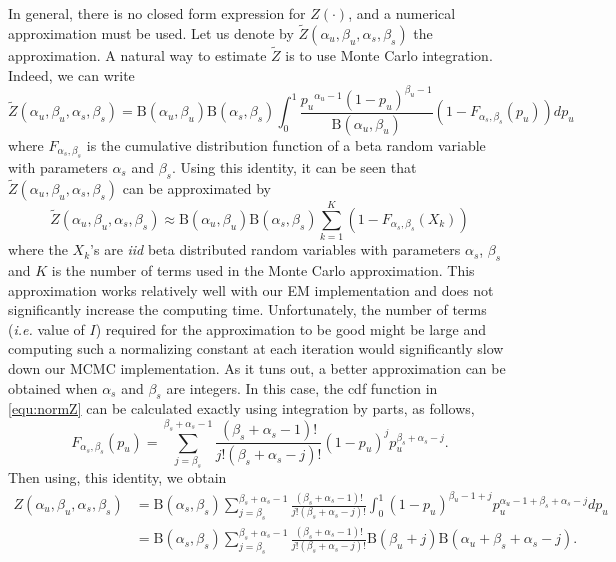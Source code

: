 \documentclass{article}
\begin{document}
In general, there is no closed form expression for $Z(\cdot)$, and a numerical approximation must be used. Let us denote by $\tilde{Z}(\alpha_u, \beta_u, \alpha_s, \beta_s)$ the approximation. A natural way to estimate $\tilde{Z}$ is to use Monte Carlo integration. Indeed, we can write 
\begin{equation}
\tilde{Z}(\alpha_u, \beta_u, \alpha_s, \beta_s)=\mathrm{B}(\alpha_u,\beta_u)\mathrm{B}(\alpha_s,\beta_s)\int_{0}^1\frac{{p_u}^{\alpha_u-1}(1-p_u)^{\beta_u-1}}{\mathrm{B}(\alpha_u,\beta_u)}(1-F_{\alpha_s,\beta_s}(p_u))dp_u
\label{equ:normZ}
\end{equation}
where $F_{\alpha_s,\beta_s}$ is the cumulative distribution function of a beta random variable with parameters $\alpha_s$ and $\beta_s$. Using this identity, it can be seen that $\tilde{Z}(\alpha_u, \beta_u, \alpha_s, \beta_s)$ can be approximated by 
\[
\tilde{Z}(\alpha_u, \beta_u, \alpha_s, \beta_s)\approx\mathrm{B}(\alpha_u,\beta_u)\mathrm{B}(\alpha_s,\beta_s)\sum_{k=1}^K(1-F_{\alpha_s,\beta_s}(X_k))
\]
where the $X_k$'s are \textit{iid} beta distributed random variables with parameters $\alpha_s$, $\beta_s$ and $K$ is the number of terms used in the Monte Carlo approximation. This approximation works relatively well with our EM implementation and does not significantly increase the computing time.
Unfortunately, the number of terms (\textit{i.e.} value of $I$) required for the approximation to be good might be large and computing such a normalizing constant at each iteration would significantly slow down our MCMC implementation. As it tuns out, a better approximation
can be obtained when $\alpha_s$ and $\beta_s$ are integers. In this case, the cdf function in \eqref{equ:normZ} can be calculated exactly using integration by parts, as follows,
\[
F_{\alpha_s,\beta_s}(p_u)=\sum_{j=\beta_s}^{\beta_s+\alpha_s-1} \frac{(\beta_s+\alpha_s-1)!}{j!(\beta_s+\alpha_s-j)!}(1-p_u)^jp_u^{\beta_s+\alpha_s-j}.
\label{eq:IBident}
\]
Then using, this identity, we obtain
\begin{align*}
Z(\alpha_u, \beta_u, \alpha_s, \beta_s)&=\mathrm{B}(\alpha_s,\beta_s)\sum_{j=\beta_s}^{\beta_s+\alpha_s-1}\frac{(\beta_s+\alpha_s-1)!}{j!(\beta_s+\alpha_s-j)!}\int_{0}^1(1-p_u)^{\beta_u-1+j}p_u^{\alpha_u-1+\beta_s+\alpha_s-j}dp_u\\
&=\mathrm{B}(\alpha_s,\beta_s)\sum_{j=\beta_s}^{\beta_s+\alpha_s-1}\frac{(\beta_s+\alpha_s-1)!}{j!(\beta_s+\alpha_s-j)!}\mathrm{B}(\beta_u+j)\mathrm{B}(\alpha_u+\beta_s+\alpha_s-j).
\label{equ:normZ}
\end{align*}
\end{document}
